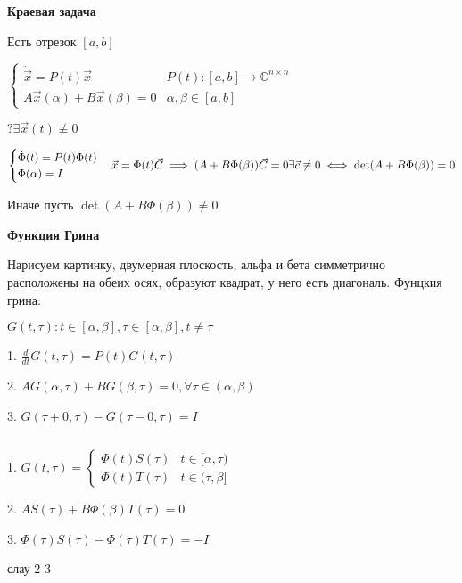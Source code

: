 \documentclass[12pt, a4paper]{article}
\begin{document}
    \par $ $

    \par $ $
    
    {\large\textbf{Краевая задача}}
    
    Есть отрезок $[a,b]$
    
    $\begin{cases}
        \dot{\vec{x}} = P(t)\vec{x}  & P(t):[a,b]\to \mathbb{C}^{n\times n}\\
        A\vec{x}(\alpha) + B\vec{x}(\beta) = 0 & \alpha, \beta \in [a,b]
    \end{cases}$

    $?\exists \vec{x}(t) \not\equiv 0$

    $\begin{cases}
        \dot\Phi(t) = P(t)\Phi(t) \\
        \Phi(\alpha) = I
    \end{cases}\vec{x} = \Phi(t)\vec{C} \implies (A + B\Phi(\beta))\vec{C} = 0
    \\\exists \vec{c}\not\equiv 0 \iff \det(A+B\Phi(\beta)) = 0$ 

    Иначе  пусть $\det(A + B\Phi(\beta)) \neq 0$

    \textbf{Функция Грина}

    Нарисуем картинку, двумерная плоскость, альфа и бета симметрично расположены на обеих осях, образуют квадрат,
    у него есть диагональ. Фунцкия грина:

    $G(t, \tau): t\in [\alpha, \beta], \tau \in [\alpha, \beta], t\neq \tau$

    1. $\frac{d}{dt} G(t, \tau) = P(t) G(t, \tau)$

    2. $AG(\alpha, \tau) + BG(\beta, \tau) = 0, \forall \tau \in (\alpha, \beta)$

    3. $G(\tau + 0, \tau) - G(\tau - 0, \tau) = I$

    \par $ $

    1. $G(t, \tau) = \begin{cases}
        \Phi(t)S(\tau) & t \in [\alpha, \tau)\\
        \Phi(t)T(\tau) & t \in (\tau, \beta]
    \end{cases}$

    2. $AS(\tau) + B\Phi(\beta)T(\tau) = 0$

    3. $\Phi(\tau)S(\tau) - \Phi(\tau)T(\tau) = - I$

    слау 2 3 
\end{document}
